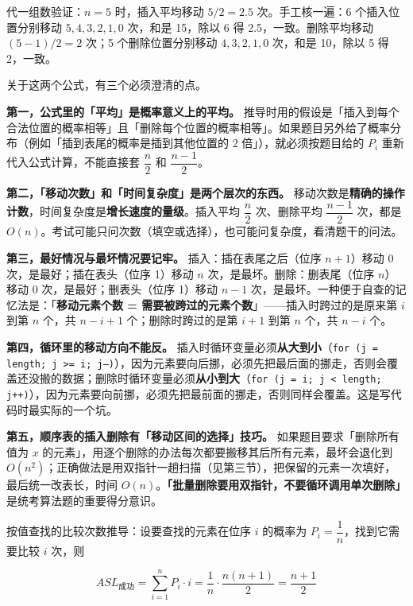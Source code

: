 \documentclass[11pt,openany,UTF8]{ctexbook}
\begin{document}
代一组数验证：$n=5$ 时，插入平均移动 $5/2 = 2.5$ 次。手工核一遍：6 个插入位置分别移动 $5,4,3,2,1,0$ 次，和是 15，除以 6 得 2.5，一致。删除平均移动 $(5-1)/2 = 2$ 次；5 个删除位置分别移动 $4,3,2,1,0$ 次，和是 10，除以 5 得 2，一致。

关于这两个公式，有三个必须澄清的点。

\textbf{第一，公式里的「平均」是概率意义上的平均。} 推导时用的假设是「插入到每个合法位置的概率相等」且「删除每个位置的概率相等」。如果题目另外给了概率分布（例如「插到表尾的概率是插到其他位置的 2 倍」），就必须按题目给的 $P_i$ 重新代入公式计算，不能直接套 $\dfrac{n}{2}$ 和 $\dfrac{n-1}{2}$。

\textbf{第二，「移动次数」和「时间复杂度」是两个层次的东西。} 移动次数是\textbf{精确的操作计数}，时间复杂度是\textbf{增长速度的量级}。插入平均 $\dfrac{n}{2}$ 次、删除平均 $\dfrac{n-1}{2}$ 次，都是 $O(n)$。考试可能只问次数（填空或选择），也可能问复杂度，看清题干的问法。

\textbf{第三，最好情况与最坏情况要记牢。} 插入：插在表尾之后（位序 $n+1$）移动 0 次，是最好；插在表头（位序 1）移动 $n$ 次，是最坏。删除：删表尾（位序 $n$）移动 0 次，是最好；删表头（位序 1）移动 $n-1$ 次，是最坏。一种便于自查的记忆法是：「\textbf{移动元素个数 = 需要被跨过的元素个数}」——插入时跨过的是原来第 $i$ 到第 $n$ 个，共 $n-i+1$ 个；删除时跨过的是第 $i+1$ 到第 $n$ 个，共 $n-i$ 个。

\textbf{第四，循环里的移动方向不能反。} 插入时循环变量必须\textbf{从大到小}（\texttt{for (j =\allowbreak{} length;\allowbreak{} j >\allowbreak{}=\allowbreak{} i;\allowbreak{} j--)\allowbreak{}}），因为元素要向后挪，必须先把最后面的挪走，否则会覆盖还没搬的数据；删除时循环变量必须\textbf{从小到大}（\texttt{for (j =\allowbreak{} i;\allowbreak{} j <\allowbreak{} length;\allowbreak{} j+\allowbreak{}+\allowbreak{})\allowbreak{}}），因为元素要向前挪，必须先把最前面的挪走，否则同样会覆盖。这是写代码时最实际的一个坑。

\textbf{第五，顺序表的插入删除有「移动区间的选择」技巧。} 如果题目要求「删除所有值为 $x$ 的元素」，用逐个删除的办法每次都要搬移其后所有元素，最坏会退化到 $O(n^2)$；正确做法是用双指针一趟扫描（见第三节），把保留的元素一次填好，最后统一改表长，时间 $O(n)$。\textbf{「批量删除要用双指针，不要循环调用单次删除」}是统考算法题的重要得分意识。

按值查找的比较次数推导：设要查找的元素在位序 $i$ 的概率为 $P_i = \dfrac{1}{n}$，找到它需要比较 $i$ 次，则

\[ASL_{\text{成功}} = \sum_{i=1}^{n} P_i \cdot i = \frac{1}{n}\cdot\frac{n(n+1)}{2} = \frac{n+1}{2}\]
\end{document}
